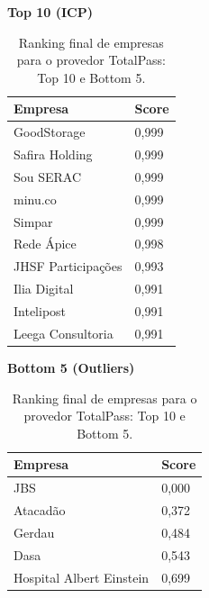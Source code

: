 \begin{table}[!htbp]
    \centering
    \caption{Ranking final de empresas para o provedor TotalPass: Top 10 e Bottom 5.}
    \label{tab:7_6_ranking_totalpass}
    \begin{minipage}{0.48\textwidth}
    \centering
    \textbf{Top 10 (ICP)}\\
    \begin{tabular}{p{5cm}p{1.8cm}}
    \toprule
    Empresa & Score \\
    \midrule
    GoodStorage & 0,999 \\
    Safira Holding & 0,999 \\
    Sou SERAC & 0,999 \\
    minu.co & 0,999 \\
    Simpar & 0,999 \\
    Rede Ápice & 0,998 \\
    JHSF Participações & 0,993 \\
    Ilia Digital & 0,991 \\
    Intelipost & 0,991 \\
    Leega Consultoria & 0,991 \\
    \bottomrule
    \end{tabular}
    \end{minipage}\hfill
    \begin{minipage}{0.48\textwidth}
    \centering
    \textbf{Bottom 5 (Outliers)}\\
    \begin{tabular}{p{5cm}p{1.8cm}}
    \toprule
    Empresa & Score \\
    \midrule
    JBS & 0,000 \\
    Atacadão & 0,372 \\
    Gerdau & 0,484 \\
    Dasa & 0,543 \\
    Hospital Albert Einstein & 0,699 \\
    \bottomrule
    \end{tabular}
    \end{minipage}
\end{table}
